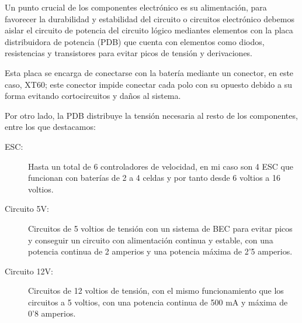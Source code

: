 
Un punto crucial de los componentes electrónico es su alimentación, para favorecer la durabilidad y estabilidad del circuito o circuitos electrónico debemos aislar el circuito de potencia del circuito lógico mediantes elementos con la placa distribuidora de potencia (PDB) que cuenta con elementos como diodos, resistencias y transistores para evitar picos de tensión y derivaciones.

Esta placa se encarga de conectarse con la batería mediante un conector, en este caso, XT60; este conector impide conectar cada polo con su opuesto debido a su forma evitando cortocircuitos y daños al sistema.

Por otro lado, la PDB distribuye la tensión necesaria al resto de los componentes, entre los que destacamos:

\begin{description}
        \item[ESC:] Hasta un total de 6 controladores de velocidad, en mi caso son 4 ESC que funcionan con baterías de 2 a 4 celdas y por tanto desde 6 voltios a 16 voltios.
        \item [Circuito 5V:] Circuitos de 5 voltios de tensión con un sistema de BEC para evitar picos y conseguir un circuito con alimentación continua y estable, con una potencia continua de 2 amperios y una potencia máxima de 2'5 amperios.
        \item [Circuito 12V:] Circuitos de 12 voltios de tensión, con el mismo funcionamiento que los circuitos a 5 voltios, con una potencia continua de 500 mA y máxima de 0'8 amperios.
\end{description}

